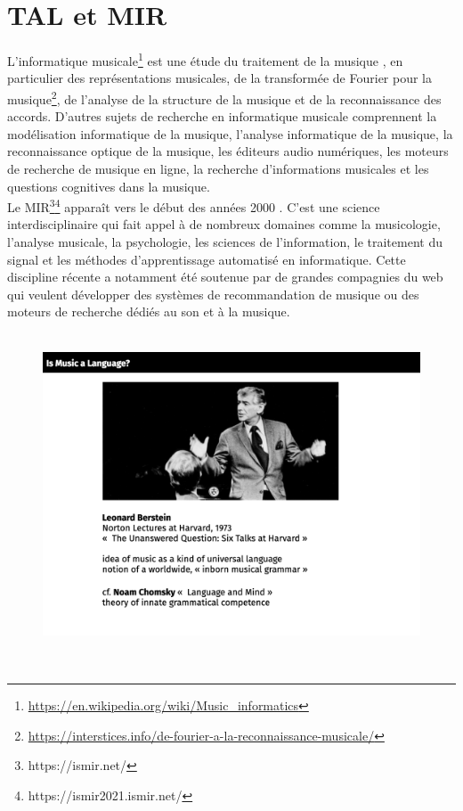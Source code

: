 \section{TAL et MIR}
L'informatique musicale\footnote{\url{https://en.wikipedia.org/wiki/Music_informatics}} est une étude du traitement de la musique \cite{book_muller}, en particulier des représentations musicales, de la transformée de Fourier pour la musique\footnote{\url{https://interstices.info/de-fourier-a-la-reconnaissance-musicale/}}, de l'analyse de la structure de la musique et de la reconnaissance des accords. D'autres sujets de recherche en informatique musicale comprennent la modélisation informatique de la musique, l'analyse informatique de la musique, la reconnaissance optique de la musique, les éditeurs audio numériques, les moteurs de recherche de musique en ligne, la recherche d'informations musicales et les questions cognitives dans la musique.\\
Le MIR\footnote{https://ismir.net/}\footnote{https://ismir2021.ismir.net/} apparaît vers le début des années 2000 \cite{MIR_1}. C’est une science interdisciplinaire qui fait appel à de nombreux domaines comme la musicologie, l’analyse musicale, la psychologie, les sciences de l’information, le traitement du signal et les méthodes d’apprentissage automatisé en informatique. Cette discipline récente a notamment été soutenue par de grandes compagnies du web qui veulent développer des systèmes de recommandation de musique ou des moteurs de recherche dédiés au son et à la musique.\\\\
\begin{figure}[!h]
	\centering
	\includegraphics[height=85mm, width=120mm]{z_images/1_contexte/0_Bernstein.png}
\end{figure}\\
